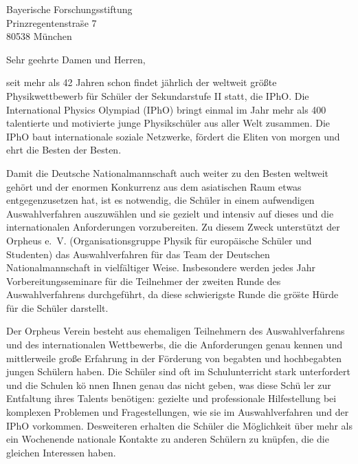 \documentclass[../style/orpheus,fontsize=11pt]{scrlttr2}
\begin{document}

\begin{letter}{
\noindent Bayerische Forschungsstiftung \\
Prinzregentenstra\"se 7\\
80538 M\"unchen
}



\opening{Sehr geehrte Damen und Herren,}

seit mehr als 42 Jahren schon findet j\"ahrlich der weltweit gr\"o\ss te Physikwettbewerb f\"ur Sch\"uler der Sekundarstufe II statt, die IPhO.  Die International Physics Olympiad (IPhO) bringt einmal im Jahr mehr als 400 talentierte und motivierte junge Physiksch\"uler aus aller Welt zusammen.  Die IPhO baut internationale soziale Netzwerke, f\"ordert die Eliten von morgen und ehrt die Besten der Besten.

Damit die Deutsche Nationalmannschaft auch weiter zu den Besten weltweit geh\"ort und der enormen Konkurrenz aus dem asiatischen Raum etwas entgegenzusetzen hat, ist es notwendig, die Sch\"uler in einem aufwendigen Auswahlverfahren auszuw\"ahlen und sie gezielt und intensiv auf dieses und die internationalen Anforderungen vorzubereiten.  Zu diesem Zweck unterst\"utzt der Orpheus e.\, V. (Organisationsgruppe Physik f\"ur europ\"aische Sch\"uler und Studenten) das Auswahlverfahren f\"ur das Team der Deutschen Nationalmannschaft in vielf\"altiger Weise.  Insbesondere werden jedes Jahr Vorbereitungsseminare f\"ur die Teilnehmer der zweiten Runde des Auswahlverfahrens durchgef\"uhrt, da diese schwierigste Runde die gr\"o\"ste H\"urde f\"ur die Sch\"uler darstellt.

Der Orpheus Verein besteht aus ehemaligen Teilnehmern des Auswahlverfahrens und des internationalen Wettbewerbs, die die Anforderungen genau kennen und mittlerweile gro\ss e Erfahrung in der F\"orderung von begabten und hochbegabten jungen Sch\"ulern haben.  Die Sch\"uler sind oft im Schulunterricht stark unterfordert und die Schulen k\"o nnen Ihnen genau das nicht geben, was diese Sch\"u ler zur Entfaltung ihres Talents ben\"otigen: gezielte und professionale Hilfestellung bei komplexen Problemen und Fragestellungen, wie sie im Auswahlverfahren und der IPhO vorkommen.  Desweiteren erhalten die Sch\"uler die M\"oglichkeit \"uber mehr als ein Wochenende nationale Kontakte zu anderen Sch\"ulern zu kn\"upfen, die die gleichen Interessen haben.


\end{letter}
\end{document}
